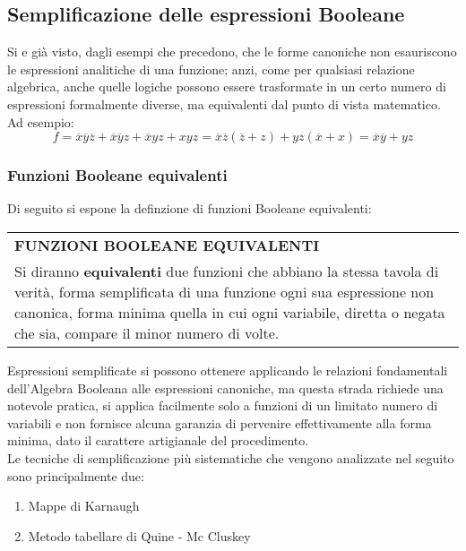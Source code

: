 \documentclass[a4paper]{extarticle}
\renewcommand\arraystretch{}
\begin{document}
\subsection{Semplificazione delle espressioni Booleane}
Si e già visto, dagli esempi che precedono, che le forme canoniche non esauriscono le espressioni analitiche di una funzione; anzi, come per qualsiasi relazione algebrica, anche quelle logiche possono essere trasformate in un certo numero di espressioni formalmente diverse, ma equivalenti dal punto di vista matematico.\\
Ad esempio:
\[f = \overline{x} \overline{y} \overline{z} + \overline{x} \overline{y} z + \overline{x}yz + xyz = \overline{x} \overline{z} (\overline{z} + z) + yz (\overline{x} + x) = \overline{x} \overline{y} + yz\]

\subsubsection{Funzioni Booleane equivalenti}
Di seguito si espone la definzione di funzioni Booleane equivalenti:

\vspace{1em}
\setlength{\tabcolsep}{14pt}
\renewcommand{\arraystretch}{2}
\noindent
\begin{tabularx}{\textwidth}{@{}|P|@{}}
    \hline
    {\textbf{FUNZIONI BOOLEANE EQUIVALENTI}}\\
    \parbox{\linewidth}{Si diranno \textbf{equivalenti} due funzioni che abbiano la stessa tavola di verità, forma semplificata di una funzione ogni sua espressione non canonica, forma minima quella in cui ogni variabile, diretta o negata che sia, compare il minor numero di volte.\vspace{3mm}}\\
    \hline
\end{tabularx}
\vspace{1em}

\noindent
Espressioni semplificate si possono ottenere applicando le relazioni fondamentali dell’Algebra Booleana alle espressioni canoniche, ma questa strada richiede una notevole pratica, si applica facilmente solo a funzioni di un limitato numero di variabili e non fornisce alcuna garanzia di pervenire effettivamente alla forma minima, dato il carattere artigianale del procedimento.\\
Le tecniche di semplificazione più sistematiche che vengono analizzate nel seguito sono principalmente due:
\begin{enumerate}
    \item Mappe di Karnaugh
    \item Metodo tabellare di Quine - Mc Cluskey
\end{enumerate}
\end{document}
